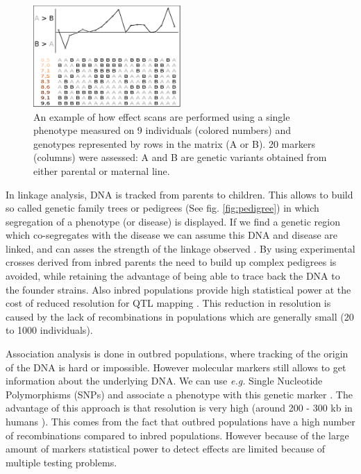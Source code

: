 \begin{figure}
  \centering
  \includegraphics[width=0.5\textwidth]{eps/image_1_1}
  \caption[Effect scan across the genome.]
    {An example of how effect scans are performed using a single phenotype measured on 9 individuals (colored numbers)
    and genotypes represented by rows in the matrix (A or B). 20 markers (columns) were assessed: A and B are genetic 
    variants obtained from either parental or maternal line. }
    \label{fig:effectscan}
\end{figure}

In linkage analysis, DNA is tracked from parents to children. This allows to build so called 
genetic family trees or pedigrees (See fig. \ref{fig:pedigree}) in which segregation of a phenotype (or 
disease) is displayed. If we find a genetic region which co-segregates with the disease we can assume this DNA and 
disease are linked, and can asses the strength of the linkage observed \cite{Rosyara:2009}. By using experimental 
crosses derived from inbred parents the need to build up complex pedigrees is avoided, while 
retaining the advantage of being able to trace back the DNA to the founder strains. Also inbred 
populations provide high statistical power at the cost of reduced resolution for QTL mapping \cite{Jansen:2001a}. 
This reduction in resolution is caused by the lack of recombinations in populations which are 
generally small (20 to 1000 individuals).

Association analysis is done in outbred populations, where tracking of the origin of the 
DNA is hard or impossible. However molecular markers still allows to get information 
about the underlying DNA. We can use \emph{e.g.} Single Nucleotide Polymorphisms (SNPs) and associate 
a phenotype with this genetic marker \cite{Mehta:2013}. The advantage of this approach is that resolution is 
very high (around 200 - 300 kb in humans \cite{HapMap:2005}). This comes from the fact that outbred populations 
have a high number of recombinations compared to inbred populations. However because of the large amount of 
markers statistical power to detect effects are limited because of multiple testing problems.


